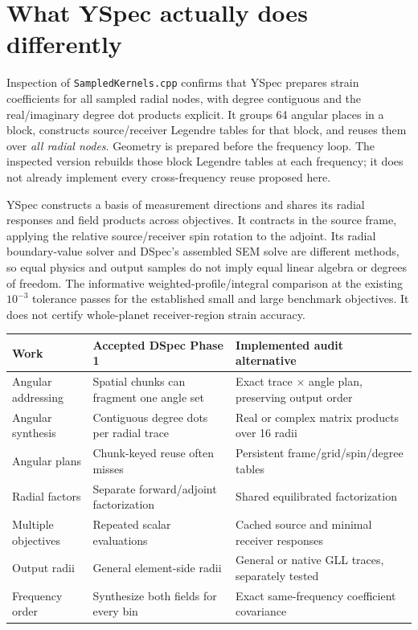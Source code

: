 \section{What YSpec actually does differently}
Inspection of \texttt{SampledKernels.cpp} confirms that YSpec prepares strain coefficients for all sampled radial nodes, with degree contiguous and the real/imaginary degree dot products explicit. It groups 64 angular places in a block, constructs source/receiver Legendre tables for that block, and reuses them over \emph{all radial nodes}. Geometry is prepared before the frequency loop. The inspected version rebuilds those block Legendre tables at each frequency; it does not already implement every cross-frequency reuse proposed here.

YSpec constructs a basis of measurement directions and shares its radial responses and field products across objectives. It contracts in the source frame, applying the relative source/receiver spin rotation to the adjoint. Its radial boundary-value solver and DSpec's assembled SEM solve are different methods, so equal physics and output samples do not imply equal linear algebra or degrees of freedom. The informative weighted-profile/integral comparison at the existing $10^{-3}$ tolerance passes for the established small and large benchmark objectives. It does not certify whole-planet receiver-region strain accuracy.

\begin{center}
\begin{tabular}{p{}p{}p{}}
\toprule
Work & Accepted DSpec Phase 1 & Implemented audit alternative\\
\midrule
Angular addressing & Spatial chunks can fragment one angle set & Exact trace $\times$ angle plan, preserving output order\\
Angular synthesis & Contiguous degree dots per radial trace & Real or complex matrix products over 16 radii\\
Angular plans & Chunk-keyed reuse often misses & Persistent frame/grid/spin/degree tables\\
Radial factors & Separate forward/adjoint factorization & Shared equilibrated factorization\\
Multiple objectives & Repeated scalar evaluations & Cached source and minimal receiver responses\\
Output radii & General element-side radii & General or native GLL traces, separately tested\\
Frequency order & Synthesize both fields for every bin & Exact same-frequency coefficient covariance\\
\bottomrule
\end{tabular}
\end{center}

